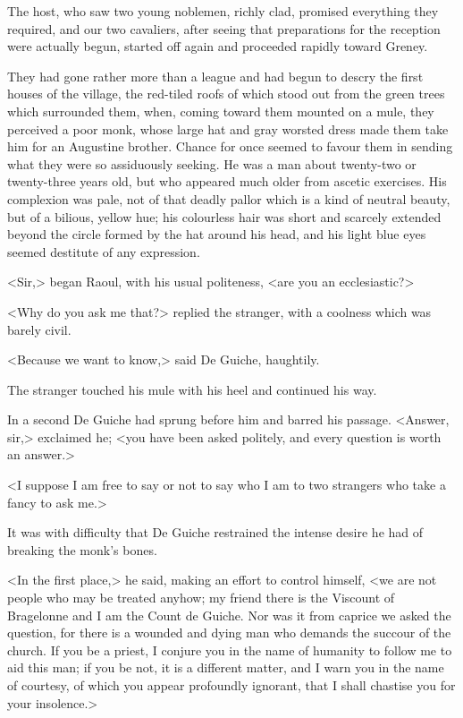 The host, who saw two young noblemen, richly clad, promised everything they required, and our two cavaliers, after seeing that preparations for the reception were actually begun, started off again and proceeded rapidly toward Greney.

They had gone rather more than a league and had begun to descry the first houses of the village, the red-tiled roofs of which stood out from the green trees which surrounded them, when, coming toward them mounted on a mule, they perceived a poor monk, whose large hat and gray worsted dress made them take him for an Augustine brother. Chance for once seemed to favour them in sending what they were so assiduously seeking. He was a man about twenty-two or twenty-three years old, but who appeared much older from ascetic exercises. His complexion was pale, not of that deadly pallor which is a kind of neutral beauty, but of a bilious, yellow hue; his colourless hair was short and scarcely extended beyond the circle formed by the hat around his head, and his light blue eyes seemed destitute of any expression.

<Sir,> began Raoul, with his usual politeness, <are you an ecclesiastic?>

<Why do you ask me that?> replied the stranger, with a coolness which was barely civil.

<Because we want to know,> said De Guiche, haughtily.

The stranger touched his mule with his heel and continued his way.

In a second De Guiche had sprung before him and barred his passage. <Answer, sir,> exclaimed he; <you have been asked politely, and every question is worth an answer.>

<I suppose I am free to say or not to say who I am to two strangers who take a fancy to ask me.>

It was with difficulty that De Guiche restrained the intense desire he had of breaking the monk's bones.

<In the first place,> he said, making an effort to control himself, <we are not people who may be treated anyhow; my friend there is the Viscount of Bragelonne and I am the Count de Guiche. Nor was it from caprice we asked the question, for there is a wounded and dying man who demands the succour of the church. If you be a priest, I conjure you in the name of humanity to follow me to aid this man; if you be not, it is a different matter, and I warn you in the name of courtesy, of which you appear profoundly ignorant, that I shall chastise you for your insolence.>

